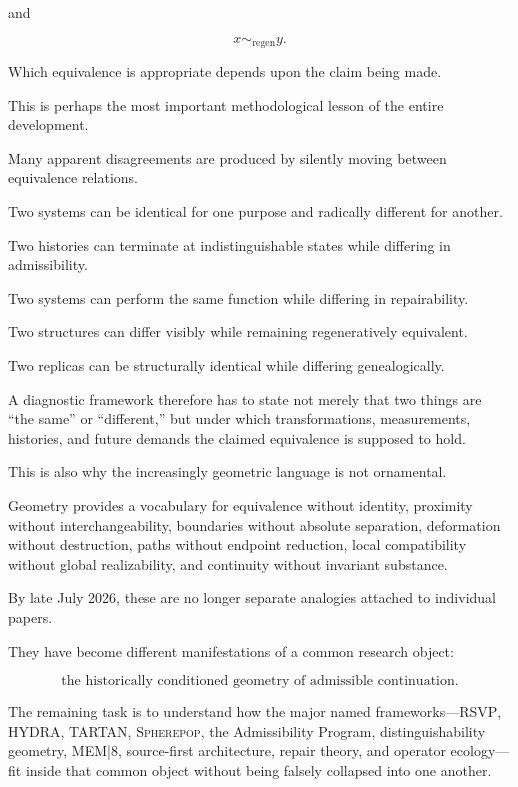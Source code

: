 \documentclass[11pt]{article}
\theoremstyle{remark}
\newcommand{\RSVP}{\textsc{RSVP}}
\newcommand{\HYDRA}{\textsc{HYDRA}}
\newcommand{\TARTAN}{\textsc{TARTAN}}
\newcommand{\MEM}{\textsc{MEM|8}}
\newcommand{\Spherepop}{\textsc{Spherepop}}
\begin{document}
and

\begin{equation}
x\sim_{\mathrm{regen}}y.
\end{equation}

Which equivalence is appropriate depends upon the claim being made.

This is perhaps the most important methodological lesson of the entire development.

Many apparent disagreements are produced by silently moving between equivalence relations.

Two systems can be identical for one purpose and radically different for another.

Two histories can terminate at indistinguishable states while differing in admissibility.

Two systems can perform the same function while differing in repairability.

Two structures can differ visibly while remaining regeneratively equivalent.

Two replicas can be structurally identical while differing genealogically.

A diagnostic framework therefore has to state not merely that two things are ``the same'' or ``different,'' but under which transformations, measurements, histories, and future demands the claimed equivalence is supposed to hold.

This is also why the increasingly geometric language is not ornamental.

Geometry provides a vocabulary for equivalence without identity, proximity without interchangeability, boundaries without absolute separation, deformation without destruction, paths without endpoint reduction, local compatibility without global realizability, and continuity without invariant substance.

By late July 2026, these are no longer separate analogies attached to individual papers.

They have become different manifestations of a common research object:

\begin{equation}
\boxed{
\text{the historically conditioned geometry of admissible continuation}.
}
\end{equation}

The remaining task is to understand how the major named frameworks---\RSVP{}, \HYDRA{}, \TARTAN{}, \Spherepop{}, the Admissibility Program, distinguishability geometry, \MEM{}, source-first architecture, repair theory, and operator ecology---fit inside that common object without being falsely collapsed into one another.
\end{document}
